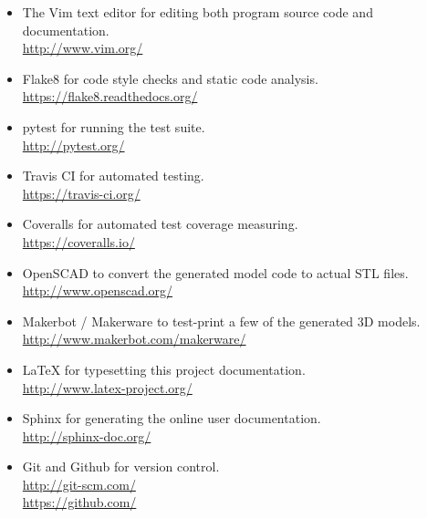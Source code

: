 \begin{itemize}
	\item The Vim text editor for editing both program source code and
		documentation.\\ \url{http://www.vim.org/}
	\item Flake8 for code style checks and static code analysis.\\
		\url{https://flake8.readthedocs.org/}
	\item pytest for running the test suite.\\
		\url{http://pytest.org/}
	\item Travis CI for automated testing.\\
		\url{https://travis-ci.org/}
	\item Coveralls for automated test coverage measuring.\\
		\url{https://coveralls.io/}
	\item OpenSCAD to convert the generated model code to actual STL files.\\
		\url{http://www.openscad.org/}
	\item Makerbot / Makerware to test-print a few of the generated 3D models.\\
		\url{http://www.makerbot.com/makerware/}
	\item \LaTeX{} for typesetting this project documentation.\\
		\url{http://www.latex-project.org/}
	\item Sphinx for generating the online user documentation.\\
		\url{http://sphinx-doc.org/}
	\item Git and Github for version control.\\
		\url{http://git-scm.com/}\\
		\url{https://github.com/}
\end{itemize}
